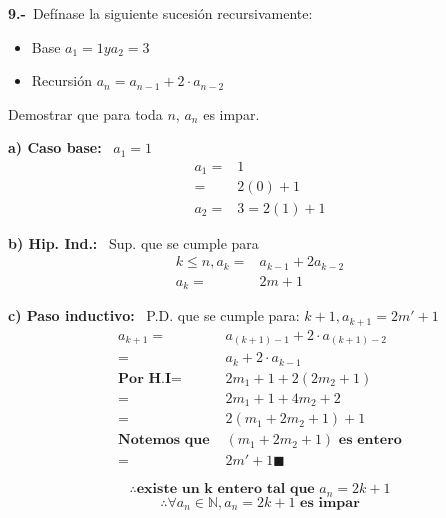 \textbf{9.-}\ Defínase la siguiente sucesión recursivamente:
\begin{itemize}
    \setlength{\itemindent}{5em} 
    \item Base $a_1 = 1 y a_2 = 3$
    \item Recursión $a_n=a_{n-1}+2\cdot a_{n-2}$
\end{itemize}
Demostrar que para toda $n$, $a_n$ es impar.

\textbf{a) Caso base: }\ $a_1=1$
\begin{align*}
    a_1=&1\\
          =&2(0)+1\\
    a_2=&3=2(1)+1
\end{align*}

\textbf{b) Hip. Ind.: }\ Sup. que se cumple para
\begin{align*}
    k\leq n,a_k=&a_{k-1}+2a_{k-2}\\
    a_k =&2m+1
\end{align*}

\textbf{c) Paso inductivo: }\ P.D. que se cumple para: $k+1,a_{k+1} =2m'+1$
\begin{align*}
    a_{k+1}=&a_{(k+1)-1}+2\cdot a_{(k+1)-2}\\
            =&a_k + 2\cdot a_{k-1}\\
    \textbf{Por H.I}=&2m_1 +1 +2(2m_2 +1)\\
                   =&2m_1 +1 +4m_2 +2\\
                    =&2(m_1 + 2m_2 +1) +1\\
\textbf{Notemos que }&(m_1 + 2m_2 +1)\textbf{ es entero}\\
      =&2m'+1\blacksquare
\end{align*}

$$\therefore \textbf{existe un k entero tal que } a_n=2k+1$$
$$\therefore \forall a_n\in \mathbb{N}, a_n=2k+1 \textbf{ es impar}$$